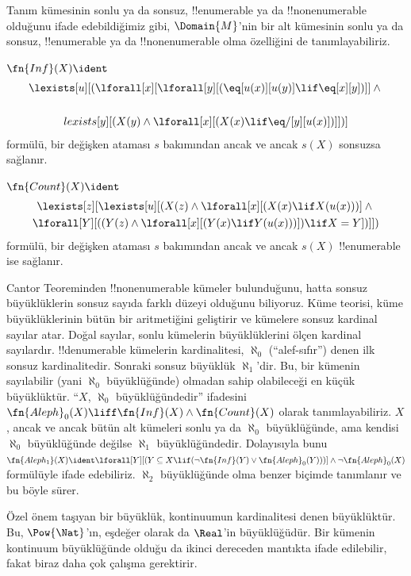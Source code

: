 



\begin{explain}
Tanım kümesinin sonlu ya da sonsuz, !!{enumerable} ya da !!{nonenumerable}
olduğunu ifade edebildiğimiz gibi, $\Domain{M}$'nin bir alt kümesinin sonlu
ya da sonsuz, !!{enumerable} ya da !!{nonenumerable} olma özelliğini de
tanımlayabiliriz.
\end{explain}

\begin{prop}
$\fn{Inf}(X)\ident$
\begin{multline*}
\lexists[u][(\lforall[x][\lforall[y][(\eq[u(x)][u(y)] \lif 
      \eq[x][y])]] \land {} \\\\lexists[y][(X(y) \land \lforall[x][(X(x)
      \lif \eq/[y][u(x)])]])]
\end{multline*}
formülü, bir değişken ataması $s$ bakımından ancak ve ancak $s(X)$ sonsuzsa
sağlanır.
\end{prop}

\begin{prop}
$\fn{Count}(X)\ident$
\begin{multline*}
\lexists[z][\lexists[u][(X(z) \land 
    \lforall[x][(X(x) \lif X(u(x)))] \land {} \\ \lforall[Y][((Y(z) \land
      \lforall[x][(Y(x) \lif Y(u(x)))]) \lif X = Y])]])
\end{multline*}
formülü, bir değişken ataması $s$ bakımından ancak ve ancak $s(X)$
!!{enumerable} ise sağlanır.
\end{prop}

Cantor Teoreminden !!{nonenumerable} kümeler bulunduğunu, hatta sonsuz
büyüklüklerin sonsuz sayıda farklı düzeyi olduğunu biliyoruz. Küme teorisi,
küme büyüklüklerinin bütün bir aritmetiğini geliştirir ve kümelere sonsuz
kardinal sayılar atar. Doğal sayılar, sonlu kümelerin büyüklüklerini ölçen
kardinal sayılardır. !!{denumerable} kümelerin kardinalitesi, $\aleph_0$
(``alef-sıfır'') denen ilk sonsuz kardinalitedir. Sonraki sonsuz büyüklük
$\aleph_1$'dir. Bu, bir kümenin sayılabilir (yani $\aleph_0$ büyüklüğünde)
olmadan sahip olabileceği en küçük büyüklüktür. ``$X$, $\aleph_0$
büyüklüğündedir'' ifadesini
$\fn{Aleph}_0(X)\liff\fn{Inf}(X)\land\fn{Count}(X)$ olarak tanımlayabiliriz.
$X$, ancak ve ancak bütün alt kümeleri sonlu ya da $\aleph_0$ büyüklüğünde,
ama kendisi $\aleph_0$ büyüklüğünde değilse $\aleph_1$ büyüklüğündedir.
Dolayısıyla bunu
$\fn{Aleph_1}(X)\ident\lforall[Y][(Y\subseteq X\lif
(\lnot\fn{Inf}(Y)\lor\fn{Aleph}_0(Y)))]\land\lnot\fn{Aleph}_0(X)$
formülüyle ifade edebiliriz. $\aleph_2$ büyüklüğünde olma benzer biçimde
tanımlanır ve bu böyle sürer.

Özel önem taşıyan bir büyüklük, kontinuumun kardinalitesi denen büyüklüktür.
Bu, $\Pow{\Nat}$'ın, eşdeğer olarak da $\Real$'in büyüklüğüdür. Bir kümenin
kontinuum büyüklüğünde olduğu da ikinci dereceden mantıkta ifade edilebilir,
fakat biraz daha çok çalışma gerektirir.

